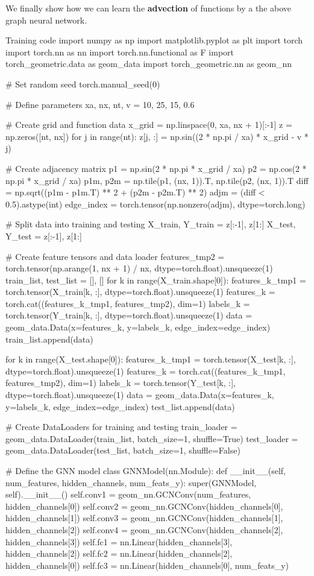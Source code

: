We finally show how we can learn the {\bf advection} of functions by a the above graph neural network. 

\begin{codeonly}{Training code}
import numpy as np
import matplotlib.pyplot as plt
import torch
import torch.nn as nn
import torch.nn.functional as F
import torch_geometric.data as geom_data
import torch_geometric.nn as geom_nn

# Set random seed
torch.manual_seed(0)

# Define parameters
xa, nx, nt, v = 10, 25, 15, 0.6

# Create grid and function data
x_grid = np.linspace(0, xa, nx + 1)[:-1]
z = np.zeros([nt, nx])
for j in range(nt):
    z[j, :] = np.sin((2 * np.pi / xa) * x_grid - v * j)

# Create adjacency matrix
p1 = np.sin(2 * np.pi * x_grid / xa)
p2 = np.cos(2 * np.pi * x_grid / xa)
p1m, p2m = np.tile(p1, (nx, 1)).T, np.tile(p2, (nx, 1)).T
diff = np.sqrt((p1m - p1m.T) ** 2 + (p2m - p2m.T) ** 2)
adjm = (diff < 0.5).astype(int)
edge_index = torch.tensor(np.nonzero(adjm), dtype=torch.long)

# Split data into training and testing
X_train, Y_train = z[:-1], z[1:]
X_test, Y_test = z[:-1], z[1:]

# Create feature tensors and data loader
features_tmp2 = torch.tensor(np.arange(1, nx + 1) / nx, dtype=torch.float).unsqueeze(1)
train_list, test_list = [], []
for k in range(X_train.shape[0]):
    features_k_tmp1 = torch.tensor(X_train[k, :], dtype=torch.float).unsqueeze(1)
    features_k = torch.cat((features_k_tmp1, features_tmp2), dim=1)
    labels_k = torch.tensor(Y_train[k, :], dtype=torch.float).unsqueeze(1)
    data = geom_data.Data(x=features_k, y=labels_k, edge_index=edge_index)
    train_list.append(data)

for k in range(X_test.shape[0]):
    features_k_tmp1 = torch.tensor(X_test[k, :], dtype=torch.float).unsqueeze(1)
    features_k = torch.cat((features_k_tmp1, features_tmp2), dim=1)
    labels_k = torch.tensor(Y_test[k, :], dtype=torch.float).unsqueeze(1)
    data = geom_data.Data(x=features_k, y=labels_k, edge_index=edge_index)
    test_list.append(data)

# Create DataLoaders for training and testing
train_loader = geom_data.DataLoader(train_list, batch_size=1, shuffle=True)
test_loader = geom_data.DataLoader(test_list, batch_size=1, shuffle=False)

# Define the GNN model
class GNNModel(nn.Module):
    def __init__(self, num_features, hidden_channels, num_feats_y):
        super(GNNModel, self).__init__()
        self.conv1 = geom_nn.GCNConv(num_features, hidden_channels[0])
        self.conv2 = geom_nn.GCNConv(hidden_channels[0], hidden_channels[1])
        self.conv3 = geom_nn.GCNConv(hidden_channels[1], hidden_channels[2])
        self.conv4 = geom_nn.GCNConv(hidden_channels[2], hidden_channels[3])
        self.fc1 = nn.Linear(hidden_channels[3], hidden_channels[2])
        self.fc2 = nn.Linear(hidden_channels[2], hidden_channels[0])
        self.fc3 = nn.Linear(hidden_channels[0], num_feats_y)


\end{codeonly}
